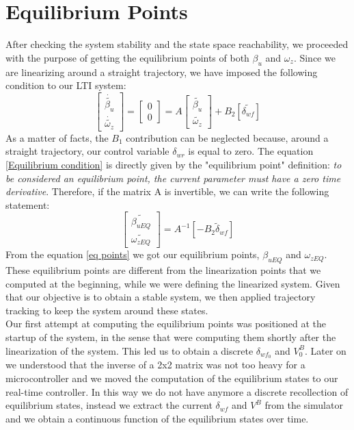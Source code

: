 	\section{Equilibrium Points}
	After checking the system stability and the state space reachability, we proceeded with the purpose of getting the equilibrium points of both $\beta_{u}$ and $\omega_{z}$. Since we are linearizing around a straight trajectory, we have imposed the following condition to our LTI system:
	\begin{equation} \label{Equilibrium condition}
	\begin{bmatrix}
	\dot{\tilde{\beta_{u}}} \\
	\dot{\tilde{\omega_{z}}}
	\end{bmatrix} =
	\begin{bmatrix}
	0 \\
	0
	\end{bmatrix} = A
	\begin{bmatrix}
	\tilde{\beta_{u}} \\
	\tilde{\omega_{z}}
	\end{bmatrix}
	 + B_{2}[\tilde{\delta_{wf}}]
	\end{equation}
	As a matter of facts, the $B_{1}$ contribution can be neglected because, around a straight trajectory, our control variable $\delta_{wr}$ is equal to zero. The equation \ref{Equilibrium condition} is directly given by the "equilibrium point" definition: \textit{to be considered an equilibrium point, the current parameter must have a zero time derivative}. Therefore, if the matrix A is invertible, we can write the following statement:
	\begin{equation} \label{eq points}
	\begin{bmatrix}
	\tilde{\beta_{uEQ}} \\
	\tilde{\omega_{zEQ}}
	\end{bmatrix} =
	A^{-1}[- B_{2} \tilde\delta_{wf}]
	\end{equation}
	From the equation \ref{eq points} we got our equilibrium points, $\beta_{uEQ}$ and $\omega_{zEQ}$. These equilibrium points are different from the linearization points that we computed at the beginning, while we were defining the linearized system. Given that our objective is to obtain a stable system, we then applied trajectory tracking to keep the system around these states.\\
	Our first attempt at computing the equilibrium points was positioned at the startup of the system, in the sense that were computing them shortly after the linearization of the system. This led us to obtain a discrete $\delta_{wf_{0}}$ and $V_{0}^B$. Later on we understood that the inverse of a 2x2 matrix was not too heavy for a microcontroller and we moved the computation of the equilibrium states to our real-time controller. In this way we do not have anymore a discrete recollection of equilibrium states, instead we extract the current $\delta_{wf}$ and $V^B$ from the simulator and we obtain a continuous function of the equilibrium states over time.
